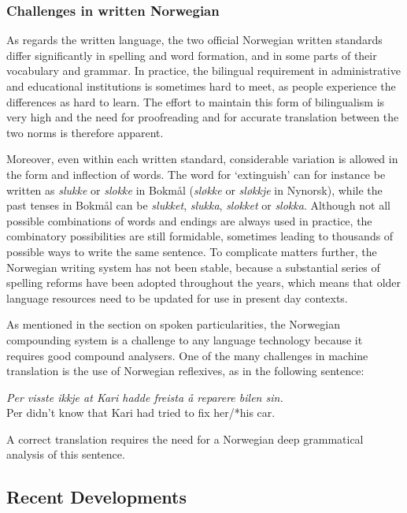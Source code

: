 \begin{multicols}{2}
\subsubsection{Challenges in written Norwegian}

As regards the written language, the two official Norwegian written standards differ significantly in spelling and word formation, and in some parts of their vocabulary and grammar. 
In practice, the bilingual requirement in administrative and educational institutions is sometimes hard to meet, as people experience the differences as hard to learn. 
The effort to maintain this form of bilingualism is very high and the need for proofreading and for accurate translation between the two norms is therefore apparent.


Moreover, even within each written standard, considerable variation is allowed in the form and inflection of words. 
The word for `extinguish' can for instance be written as \textit{slukke} or \textit{slokke} in Bokmål (\textit{sløkke} or \textit{sløkkje} in Nynorsk), while the past tenses in Bokmål can be \textit{slukket}, \textit{slukka}, \textit{slokket} or \textit{slokka}. 
Although not all possible combinations of words and endings are always used in practice, the combinatory possibilities are still formidable, sometimes leading to thousands of possible ways to write the same sentence. 
To complicate matters further, the Norwegian writing system has not been stable, because a substantial series of spelling reforms have been adopted throughout the years, which means that older language resources need to be updated for use in present day contexts.

As mentioned in the section on spoken particularities, the Norwegian compounding system is a challenge to any language technology because it requires good compound analysers.
One of the many challenges in machine translation is the use of Norwegian reflexives, as in the following sentence:

\smallskip
\emph{Per visste ikkje at Kari hadde freista å reparere bilen \emph{sin}.}\\
Per didn’t know that Kari had tried to fix her/*his car.

\smallskip
A correct translation requires the need for a Norwegian deep grammatical analysis of this sentence.

\subsection{Recent Developments}


\end{multicols}
